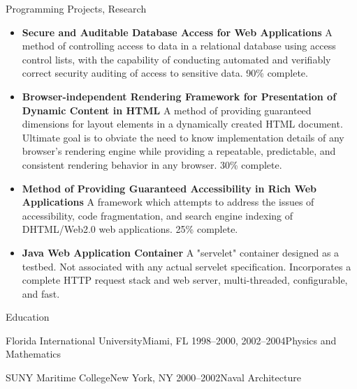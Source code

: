 \documentclass[9pt,oneside]{article}
\newenvironment{ressection}[1]{
	\vspace{4pt}
	{\fontfamily{phv}\selectfont\Large#1}
	\begin{itemize}
	\vspace{3pt}
}{
	\end{itemize}
}
\newcommand{\resitem}[1]{
	\vspace{-4pt}
	\item \begin{flushleft} #1 \end{flushleft}
}
\begin{document}
\begin{ressection}{Programming Projects, Research}

	\resitem{\textbf{Secure and Auditable Database Access for Web Applications} A method of controlling access to data in a relational database using access control lists, with the capability of conducting automated and verifiably correct security auditing of access to sensitive data. 90\% complete.}
	\resitem{\textbf{Browser-independent Rendering Framework for Presentation of Dynamic Content in HTML} A method of providing guaranteed dimensions for layout elements in a dynamically created HTML document. Ultimate goal is to obviate the need to know implementation details of any browser's rendering engine while providing a repeatable, predictable, and consistent rendering behavior in any browser. 30\% complete.}
	\resitem{\textbf{Method of Providing Guaranteed Accessibility in Rich Web Applications} A framework which attempts to address the issues of accessibility, code fragmentation, and search engine indexing of DHTML/Web2.0 web applications. 25\% complete.}
	\resitem{\textbf{Java Web Application Container} A "servelet" container designed as a testbed. Not associated with any actual servelet specification. Incorporates a complete HTTP request stack and web server, multi-threaded, configurable, and fast.}

\end{ressection}

\begin{ressection}{Education}

	\begin{resbigitem}{Florida International University}{Miami, FL 1998--2000, 2002--2004}{Physics and Mathematics}
	\end{resbigitem}

	\begin{resbigitem}{SUNY Maritime College}{New York, NY 2000--2002}{Naval Architecture}
	\end{resbigitem}

\end{ressection}
\end{document}
